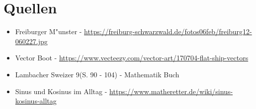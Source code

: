 \documentclass{standalone}
\begin{document}
\section{Quellen}
\begin{itemize}
  \item Freiburger M{"u}nster - \url{https://freiburg-schwarzwald.de/fotos06feb/freiburg12-060227.jpg}
  \item Vector Boot - \url{https://www.vecteezy.com/vector-art/170704-flat-ship-vectors}
  \item Lambacher Sweizer 9(S. 90 - 104) - Mathematik Buch
  \item Sinus und Kosinus im Alltag - \url{https://www.matheretter.de/wiki/sinus-kosinus-alltag}
\end{itemize}
\end{document}
